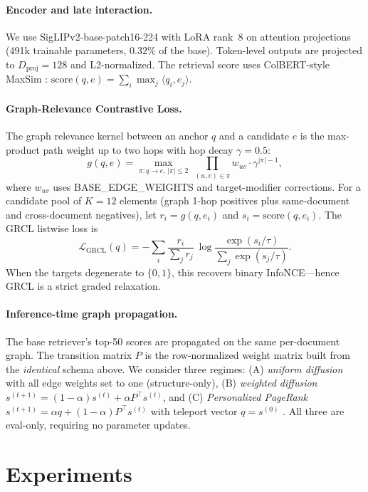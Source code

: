 \documentclass{article}
\begin{document}
\paragraph{Encoder and late interaction.} We use SigLIPv2-base-patch16-224
\cite{siglip2} with LoRA rank~8 on attention projections (491k trainable
parameters, $0.32\%$ of the base). Token-level outputs are projected to
$D_\text{proj}\!=\!128$ and L2-normalized. The retrieval score uses
ColBERT-style MaxSim \cite{colbert}:
$\textstyle\mathrm{score}(q,e) = \sum_i \max_j \langle q_i, e_j\rangle$.

\paragraph{Graph-Relevance Contrastive Loss.} The graph relevance kernel
between an anchor $q$ and a candidate $e$ is the max-product path weight up
to two hops with hop decay $\gamma\!=\!0.5$:
\[
g(q,e) = \max_{\pi:q\to e,\,|\pi|\le 2}\ \prod_{(u,v)\in\pi} w_{uv}\cdot \gamma^{|\pi|-1},
\]
where $w_{uv}$ uses BASE\_EDGE\_WEIGHTS and target-modifier corrections.
For a candidate pool of $K\!=\!12$ elements (graph 1-hop positives plus
same-document and cross-document negatives), let $r_i\!=\!g(q,e_i)$ and
$s_i\!=\!\mathrm{score}(q,e_i)$. The GRCL listwise loss is
\[
\mathcal{L}_\text{GRCL}(q) = -\sum_i \frac{r_i}{\sum_j r_j}\ \log\frac{\exp(s_i/\tau)}{\sum_j \exp(s_j/\tau)}.
\]
When the targets degenerate to $\{0,1\}$, this recovers binary
InfoNCE---hence GRCL is a strict graded relaxation.

\paragraph{Inference-time graph propagation.} The base retriever's top-50
scores are propagated on the same per-document graph. The transition matrix
$P$ is the row-normalized weight matrix built from the \emph{identical}
schema above. We consider three regimes: (A) \emph{uniform diffusion} with all
edge weights set to one (structure-only), (B) \emph{weighted diffusion}
$s^{(t+1)} = (1\!-\!\alpha)s^{(t)} + \alpha P^\top s^{(t)}$, and
(C) \emph{Personalized PageRank} $s^{(t+1)} = \alpha q + (1\!-\!\alpha) P^\top s^{(t)}$
with teleport vector $q = s^{(0)}$ \cite{ppr}. All three are eval-only,
requiring no parameter updates.

\section{Experiments}
\end{document}
